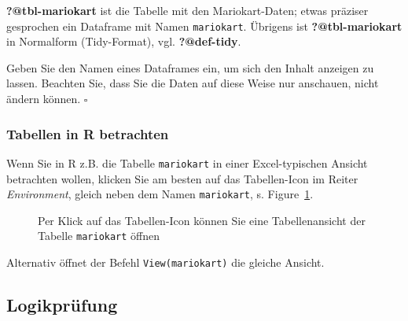 \documentclass[
  letterpaper,
  DIV=11,
  numbers=noendperiod]{scrartcl}
\theoremstyle{definition}
\theoremstyle{definition}
\theoremstyle{definition}
\theoremstyle{remark}
\begin{document}
\textbf{?@tbl-mariokart} ist die Tabelle mit den Mariokart-Daten; etwas
präziser gesprochen ein Dataframe mit Namen \texttt{mariokart}. Übrigens
ist \textbf{?@tbl-mariokart} in Normalform (Tidy-Format), vgl.
\textbf{?@def-tidy}.

\begin{tcolorbox}[enhanced jigsaw, coltitle=black, colframe=quarto-callout-note-color-frame, opacityback=0, toprule=.15mm, opacitybacktitle=0.6, arc=.35mm, titlerule=0mm, toptitle=1mm, title=\textcolor{quarto-callout-note-color}{\faInfo}\hspace{0.5em}{Note}, bottomtitle=1mm, leftrule=.75mm, breakable, rightrule=.15mm, colbacktitle=quarto-callout-note-color!10!white, bottomrule=.15mm, colback=white, left=2mm]

Geben Sie den Namen eines Dataframes ein, um sich den Inhalt anzeigen zu
lassen. Beachten Sie, dass Sie die Daten auf diese Weise nur anschauen,
nicht ändern können. \(\square\)

\end{tcolorbox}

\subsubsection{Tabellen in R betrachten}\label{sec-viewtab}

Wenn Sie in R z.B. die Tabelle \texttt{mariokart} in einer
Excel-typischen Ansicht betrachten wollen, klicken Sie am besten auf das
Tabellen-Icon im Reiter \emph{Environment}, gleich neben dem Namen
\texttt{mariokart}, s. Figure~\ref{fig-view-mariokart}.

\begin{figure}


\caption{\label{fig-view-mariokart}Per Klick auf das Tabellen-Icon
können Sie eine Tabellenansicht der Tabelle \texttt{mariokart} öffnen}

\end{figure}%

Alternativ öffnet der Befehl \texttt{View(mariokart)} die gleiche
Ansicht.

\subsection{Logikprüfung}\label{sec-logic}
\end{document}
